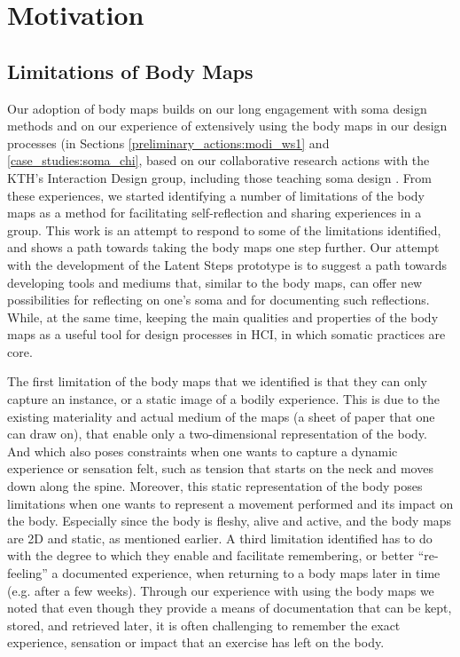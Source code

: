 
\section{Motivation}

\subsection*{Limitations of Body Maps}

Our adoption of body maps builds on our long engagement with soma design methods and on our experience of extensively using the body maps in our design processes (in Sections \ref{preliminary_actions:modi_ws1} and \ref{case_studies:soma_chi}, based on our collaborative research actions with the KTH's Interaction Design group, including those teaching soma design \cite{tsaknaki_teaching_2019}. From these experiences, we started identifying a number of limitations of the body maps as a method for facilitating self-reflection and sharing experiences in a group. This work is an attempt to respond to some of the limitations identified, and shows a path towards taking the body maps one step further. Our attempt with the development of the Latent Steps prototype is to suggest a path towards developing tools and mediums that, similar to the body maps, can offer new possibilities for reflecting on one's soma and for documenting such reflections. While, at the same time, keeping the main qualities and properties of the body maps as a useful tool for design processes in HCI, in which somatic practices are core.

The first limitation of the body maps that we identified is that they can only capture an instance, or a static image of a bodily experience. This is due to the existing materiality and actual medium of the maps (a sheet of paper that one can draw on), that enable only a two-dimensional representation of the body. And which also poses constraints when one wants to capture a dynamic experience or sensation felt, such as tension that starts on the neck and moves down along the spine. Moreover, this static representation of the body poses limitations when one wants to represent a movement performed and its impact on the body. Especially since the body is fleshy, alive and active, and the body maps are 2D and static, as mentioned earlier. A third limitation identified has to do with the degree to which they enable and facilitate remembering, or better ``re-feeling'' a documented experience, when returning to a body maps later in time (e.g. after a few weeks). Through our experience with using the body maps we noted that even though they provide a means of documentation that can be kept, stored, and retrieved later, it is often challenging to remember the exact experience, sensation or impact that an exercise has left on the body.


